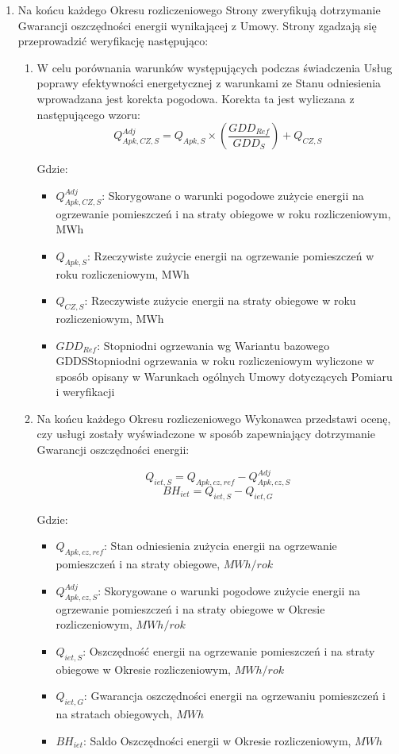 \begin{enumerate}
	\item Na końcu każdego Okresu rozliczeniowego Strony zweryfikują dotrzymanie Gwarancji oszczędności energii wynikającej z Umowy. Strony zgadzają się przeprowadzić weryfikację następująco:
	\begin{enumerate}
		\item W celu porównania warunków występujących podczas świadczenia Usług poprawy efektywności energetycznej z warunkami ze Stanu odniesienia wprowadzana jest korekta pogodowa. Korekta ta jest wyliczana z następującego wzoru:
\[ Q^{Adj}_{Apk,CZ,S} = Q_{Apk,S} \times \left( \frac{GDD_{Ref}}{GDD_S}\right) + Q_{CZ,S} \]

Gdzie:

\begin{itemize}
	\item $Q^{Adj}_{Apk,CZ,S}$: Skorygowane o warunki pogodowe zużycie energii na ogrzewanie pomieszczeń i na straty obiegowe w roku rozliczeniowym, MWh
	\item $Q_{Apk,S}$: Rzeczywiste zużycie energii na ogrzewanie pomieszczeń w roku rozliczeniowym, MWh
	\item $Q_{CZ,S}$: Rzeczywiste zużycie energii na straty obiegowe w roku rozliczeniowym, MWh
	\item $GDD_{Ref}$:  Stopniodni ogrzewania wg Wariantu bazowego GDDSStopniodni ogrzewania w roku rozliczeniowym wyliczone w sposób opisany w Warunkach ogólnych Umowy dotyczących Pomiaru i weryfikacji
\end{itemize}

	\item Na końcu każdego Okresu rozliczeniowego Wykonawca przedstawi ocenę, czy usługi zostały wyświadczone w sposób zapewniający dotrzymanie Gwarancji oszczędności energii:

\[ Q_{iet,S} = Q_{Apk,cz,ref} - Q^{Adj}_{Apk,cz,S} \]
\[ BH_{iet} = Q_{iet,S} - Q_{iet,G} \]

Gdzie:

\begin{itemize}
\item $Q_{Apk,cz,ref}$: Stan odniesienia zużycia energii na ogrzewanie pomieszczeń i na straty obiegowe, $MWh/rok $
\item $Q^{Adj}_{Apk,cz,S}$: Skorygowane o warunki pogodowe zużycie energii na ogrzewanie pomieszczeń i na straty obiegowe w Okresie rozliczeniowym, $MWh/rok$
\item $Q_{iet,S}$: Oszczędność energii na ogrzewanie pomieszczeń i na straty obiegowe w Okresie rozliczeniowym, $MWh/rok$
\item $Q_{iet,G}$: Gwarancja oszczędności energii na ogrzewaniu pomieszczeń i na stratach obiegowych, $MWh$
\item $BH_{iet}$: Saldo Oszczędności energii w Okresie rozliczeniowym, $MWh$
\end{itemize}


\end{enumerate}
\end{enumerate}
